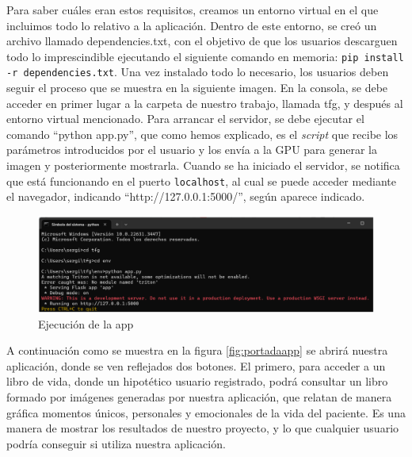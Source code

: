 Para saber cuáles eran estos requisitos, creamos un entorno virtual en el que incluimos todo lo relativo a la aplicación. Dentro de este entorno, se creó un archivo llamado dependencies.txt, con el objetivo de que los usuarios descarguen todo lo imprescindible ejecutando el siguiente comando en memoria: \texttt{pip install -r dependencies.txt}. Una vez instalado todo lo necesario, los usuarios deben seguir el proceso que se muestra en la siguiente imagen. En la consola, se debe acceder en primer lugar a la carpeta de nuestro trabajo, llamada tfg, y después al entorno virtual mencionado. Para arrancar el servidor, se debe ejecutar el comando ``python app.py'', que como hemos explicado, es el \textit{script} que recibe los parámetros introducidos por el usuario y los envía a la GPU para generar la imagen y posteriormente mostrarla. Cuando se ha iniciado el servidor, se notifica que está funcionando en el puerto \texttt{localhost}, al cual se puede acceder mediante el navegador, indicando “http://127.0.0.1:5000/”, según aparece indicado. \\
\begin{figure}[!htb]
	\centering
	\includegraphics[width = 1
	\textwidth]{Imagenes/Vectorial/exeapp.png}
	\caption{Ejecución de la app}
	\label{fig:appexe}
\end{figure}

A continuación como se muestra en la figura \ref{fig:portadaapp} se abrirá nuestra aplicación, donde se ven reflejados dos botones. El primero, para acceder a un libro de vida, donde un hipotético usuario registrado, podrá consultar un libro formado por imágenes generadas por nuestra aplicación, que relatan de manera gráfica momentos únicos, personales y emocionales de la vida del paciente. Es una manera de mostrar los resultados de nuestro proyecto, y lo que cualquier usuario podría conseguir si utiliza nuestra aplicación. \\

